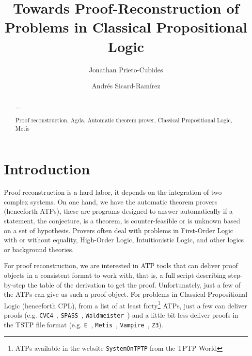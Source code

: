 \documentclass[runningheads,a4paper]{llncs}
\newcommand{\keywords}[1]{\par\addvspace\baselineskip
\noindent\keywordname\enspace\ignorespaces#1}
\begin{document}
\mainmatter  %

\title{Towards Proof-Reconstruction of Problems in Classical Propositional Logic}


\author{Jonathan Prieto-Cubides%
\and Andr\'es Sicard-Ram\'irez}
%


\maketitle


\begin{abstract}
...
\keywords{Proof reconstruction, Agda, Automatic theorem prover, Classical Propositional Logic, Metis }
\end{abstract}

\section{Introduction}
Proof reconstruction is a hard labor, it depends on the integration of two complex systems. On one hand, we have the automatic theorem provers (henceforth ATPs), these are programs designed to answer automatically if a statement, the conjecture, is a theorem, is counter-feasible or is unknown based on a set of hypothesis. Provers often deal with problems in First-Order Logic with or without equality, High-Order Logic, Intuitionistic Logic, and other logics or background theories.

For proof reconstruction, we are interested in ATP tools that can deliver proof objects in a consistent format to work with, that is, a full   script  describing  step-by-step the table of the derivation to get the proof. Unfortunately, just a few of the ATPs can give us such a proof object. For problems in Classical Propositional Logic (henceforth CPL), from a list of at least forty\footnote{ATPs available in the website  \texttt{SystemOnTPTP} from the TPTP World} ATPs, just a few can deliver proofs (e.g. \verb!CVC4!~\cite{Barrett2011}, \verb!SPASS!~\cite{Weidenbach2009}, \verb!Waldmeister!~\cite{hillenbrand1997}) and a little bit less deliver proofs in the TSTP file format (e.g. \verb!E!~\cite{Schulz:AICOM-2002}, \verb!Metis!~\cite{hurd2003first}, \verb!Vampire!~\cite{Riazanov1999}, \verb!Z3!).
\end{document}
